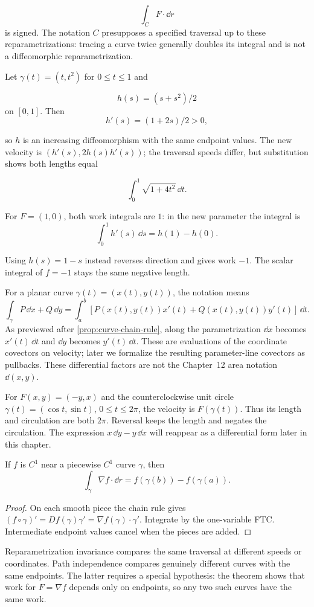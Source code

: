 \[
\int_C F\cdot\dd r
\]
 is signed. The notation $C$ presupposes a specified
traversal up to these reparametrizations: tracing a curve twice generally
doubles its integral and is not a diffeomorphic reparametrization.


\begin{example}
Let $\gamma(t)=(t,t^2)$ for $0\leq t\leq1$ and

\[
h(s)=(s+s^2)/2
\]
 on $[0,1]$. Then
\[
h'(s)=(1+2s)/2>0,
\]

so $h$ is an increasing diffeomorphism with the same endpoint values.
The new velocity is $(h'(s),2h(s)h'(s))$; the traversal speeds differ,
but substitution shows both lengths equal

\[
\int_0^1\sqrt{1+4t^2}\,\dd t.
\]

For $F=(1,0)$, both work integrals are $1$: in the new parameter
the integral is
\[
\int_0^1h'(s)\,\dd s=h(1)-h(0).
\]

Using $h(s)=1-s$ instead reverses direction and gives work $-1$.
The scalar integral of $f=-1$ stays the same negative length.
\end{example}
For a planar curve $\gamma(t)=(x(t),y(t))$, the notation means
\[
\int_\gamma P\,\dd x+Q\,\dd y
=\int_a^b[P(x(t),y(t))x'(t)+Q(x(t),y(t))y'(t)]\,\dd t.
\]
As previewed after \cref{prop:curve-chain-rule}, along the parametrization
$\dd x$ becomes $x'(t)\,\dd t$ and $\dd y$ becomes $y'(t)\,\dd t$.
These are evaluations of the coordinate covectors on velocity; later
we formalize the resulting parameter-line covectors as pullbacks.
These differential factors are not the Chapter~12 area notation $\dd(x,y)$.

\begin{example}
For $F(x,y)=(-y,x)$ and the counterclockwise unit circle
$\gamma(t)=(\cos t,\sin t)$, $0\leq t\leq2\pi$, the velocity is $F(\gamma(t))$.
Thus its length and circulation are both $2\pi$. Reversal keeps the length
and negates the circulation. The expression $x\,\dd y-y\,\dd x$ will
reappear as a differential form later in this chapter.
\end{example}

\begin{theorem}
\label{thm:line-ftc}
If $f$ is $C^1$ near a piecewise $C^1$ curve $\gamma$, then
\[
\int_\gamma\nabla f\cdot\dd r=f(\gamma(b))-f(\gamma(a)).
\]
\end{theorem}
\begin{proof}
On each smooth piece the chain rule gives
$(f\circ\gamma)'=Df(\gamma)\gamma'=\nabla f(\gamma)\cdot\gamma'$.
Integrate by the one-variable FTC. Intermediate endpoint values cancel
when the pieces are added.
\end{proof}
Reparametrization invariance compares the same traversal at different
speeds or coordinates. Path independence compares genuinely different
curves with the same endpoints. The latter requires a special hypothesis:
the theorem shows that work for $F=\nabla f$ depends only on endpoints,
so any two such curves have the same work.

